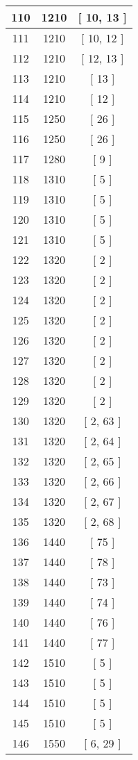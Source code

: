 \begin{center}
\begin{longtable}[H]{|| c c c ||}
\hline
110 & 1210 & [ 10, 13 ] \\ 
\hline
111 & 1210 & [ 10, 12 ] \\ 
\hline
112 & 1210 & [ 12, 13 ] \\ 
\hline
113 & 1210 & [ 13 ] \\ 
\hline
114 & 1210 & [ 12 ] \\ 
\hline
115 & 1250 & [ 26 ] \\ 
\hline
116 & 1250 & [ 26 ] \\ 
\hline
117 & 1280 & [ 9 ] \\ 
\hline
118 & 1310 & [ 5 ] \\ 
\hline
119 & 1310 & [ 5 ] \\ 
\hline
120 & 1310 & [ 5 ] \\ 
\hline
121 & 1310 & [ 5 ] \\ 
\hline
122 & 1320 & [ 2 ] \\ 
\hline
123 & 1320 & [ 2 ] \\ 
\hline
124 & 1320 & [ 2 ] \\ 
\hline
125 & 1320 & [ 2 ] \\ 
\hline
126 & 1320 & [ 2 ] \\ 
\hline
127 & 1320 & [ 2 ] \\ 
\hline
128 & 1320 & [ 2 ] \\ 
\hline
129 & 1320 & [ 2 ] \\ 
\hline
130 & 1320 & [ 2, 63 ] \\ 
\hline
131 & 1320 & [ 2, 64 ] \\ 
\hline
132 & 1320 & [ 2, 65 ] \\ 
\hline
133 & 1320 & [ 2, 66 ] \\ 
\hline
134 & 1320 & [ 2, 67 ] \\ 
\hline
135 & 1320 & [ 2, 68 ] \\ 
\hline
136 & 1440 & [ 75 ] \\ 
\hline
137 & 1440 & [ 78 ] \\ 
\hline
138 & 1440 & [ 73 ] \\ 
\hline
139 & 1440 & [ 74 ] \\ 
\hline
140 & 1440 & [ 76 ] \\ 
\hline
141 & 1440 & [ 77 ] \\ 
\hline
142 & 1510 & [ 5 ] \\ 
\hline
143 & 1510 & [ 5 ] \\ 
\hline
144 & 1510 & [ 5 ] \\ 
\hline
145 & 1510 & [ 5 ] \\ 
\hline
146 & 1550 & [ 6, 29 ] \\ 

\end{longtable}
\end{center}
